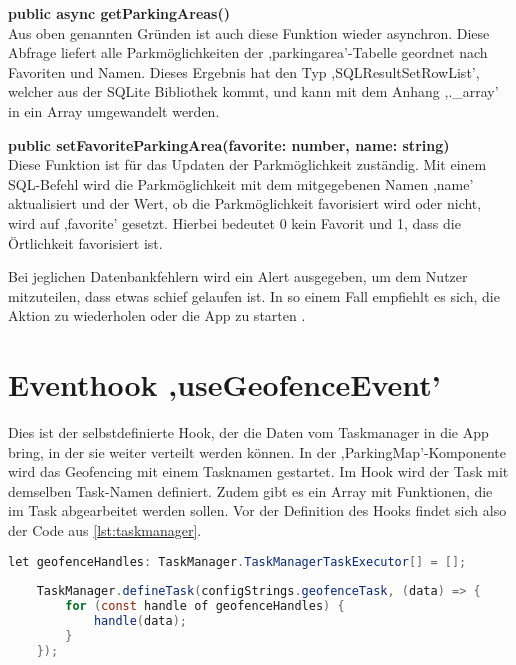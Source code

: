 \begin{description}
	\item \textbf{public async getParkingAreas()} \\ Aus oben genannten Gründen ist auch diese Funktion wieder asynchron. Diese Abfrage liefert alle Parkmöglichkeiten der ,parkingarea'-Tabelle geordnet nach Favoriten und Namen. Dieses Ergebnis hat den Typ ,SQLResultSetRowList', welcher aus der SQLite Bibliothek kommt, und kann mit dem Anhang ,.\_array' in ein Array umgewandelt werden.
	\item \textbf{public setFavoriteParkingArea(favorite: number, name: string)} \\ Diese Funktion ist für das Updaten der Parkmöglichkeit zuständig. Mit einem SQL-Befehl wird die Parkmöglichkeit mit dem mitgegebenen Namen ,name' aktualisiert und der Wert, ob die Parkmöglichkeit favorisiert wird oder nicht, wird auf ,favorite' gesetzt. Hierbei bedeutet 0 kein Favorit und 1, dass die Örtlichkeit favorisiert ist.
\end{description}

Bei jeglichen Datenbankfehlern wird ein Alert ausgegeben, um dem Nutzer mitzuteilen, dass etwas schief gelaufen ist. In so einem Fall empfiehlt es sich, die Aktion zu wiederholen oder die App zu starten \cite{sqlite}.

\section{Eventhook ,useGeofenceEvent'}
\label{geofenceEvent}
Dies ist der selbstdefinierte Hook, der die Daten vom Taskmanager in die App bring, in der sie weiter verteilt werden können. In der ,ParkingMap'-Komponente wird das Geofencing mit einem Tasknamen gestartet. Im Hook wird der Task mit demselben Task-Namen definiert. Zudem gibt es ein Array mit Funktionen, die im Task abgearbeitet werden sollen. Vor der Definition des Hooks findet sich also der Code aus \autoref{lst:taskmanager}.

\begin{lstlisting}[caption={Dieser Code befindet sich vor der Definition des Eventhooks. Hier wird ein Array angelegt, welches Funktionen beinhaltet. Diese werden dann ab Zeile 11 im definierten Task abgearbeitet. (Quelle: Eigene Implementierung)},captionpos=b, language=Java, label=lst:taskmanager]
	let geofenceHandles: TaskManager.TaskManagerTaskExecutor[] = [];
	
	TaskManager.defineTask(configStrings.geofenceTask, (data) => {
		for (const handle of geofenceHandles) {
			handle(data);
		}
	});
\end{lstlisting}

